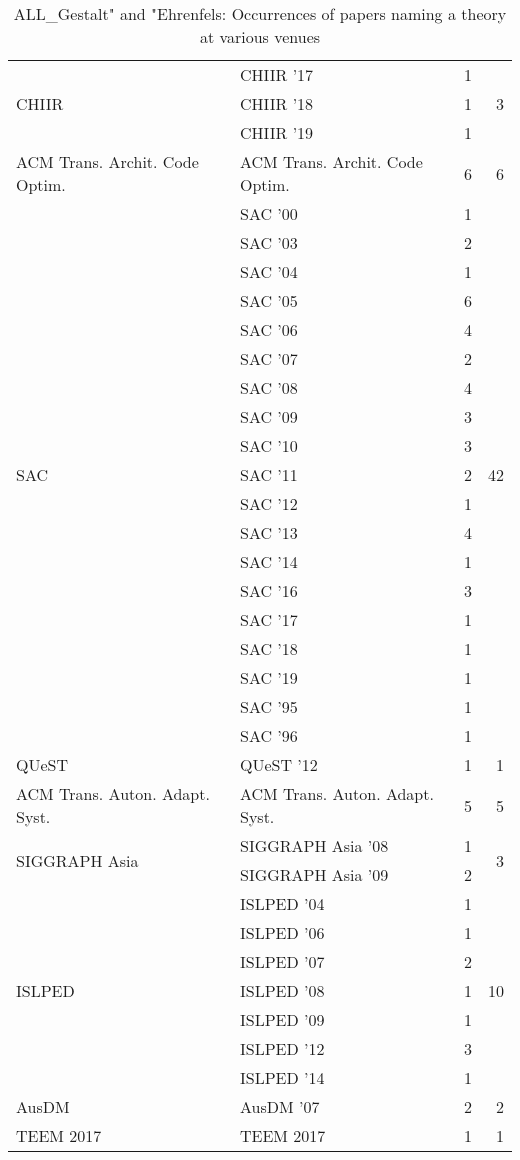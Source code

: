 \begin{table*}[t]
\begin{tabular}{llrr}
\multirow{3}{*}{CHIIR } & CHIIR '17 & 1 & \multirow{3}{*}{3}\\
& CHIIR '18 & 1 &\\
& CHIIR '19 & 1 &\\
\multirow{1}{*}{ACM Trans. Archit. Code Optim.} & ACM Trans. Archit. Code Optim. & 6 & \multirow{1}{*}{6}\\
\multirow{19}{*}{SAC } & SAC '00 & 1 & \multirow{19}{*}{42}\\
& SAC '03 & 2 &\\
& SAC '04 & 1 &\\
& SAC '05 & 6 &\\
& SAC '06 & 4 &\\
& SAC '07 & 2 &\\
& SAC '08 & 4 &\\
& SAC '09 & 3 &\\
& SAC '10 & 3 &\\
& SAC '11 & 2 &\\
& SAC '12 & 1 &\\
& SAC '13 & 4 &\\
& SAC '14 & 1 &\\
& SAC '16 & 3 &\\
& SAC '17 & 1 &\\
& SAC '18 & 1 &\\
& SAC '19 & 1 &\\
& SAC '95 & 1 &\\
& SAC '96 & 1 &\\
\multirow{1}{*}{QUeST } & QUeST '12 & 1 & \multirow{1}{*}{1}\\
\multirow{1}{*}{ACM Trans. Auton. Adapt. Syst.} & ACM Trans. Auton. Adapt. Syst. & 5 & \multirow{1}{*}{5}\\
\multirow{2}{*}{SIGGRAPH Asia } & SIGGRAPH Asia '08 & 1 & \multirow{2}{*}{3}\\
& SIGGRAPH Asia '09 & 2 &\\
\multirow{7}{*}{ISLPED } & ISLPED '04 & 1 & \multirow{7}{*}{10}\\
& ISLPED '06 & 1 &\\
& ISLPED '07 & 2 &\\
& ISLPED '08 & 1 &\\
& ISLPED '09 & 1 &\\
& ISLPED '12 & 3 &\\
& ISLPED '14 & 1 &\\
\multirow{1}{*}{AusDM } & AusDM '07 & 2 & \multirow{1}{*}{2}\\
\multirow{1}{*}{TEEM 2017} & TEEM 2017 & 1 & \multirow{1}{*}{1}\\
\end{tabular}
\caption{ALL\_Gestalt" and "Ehrenfels: Occurrences of papers naming a theory at various venues}
\end{table*}